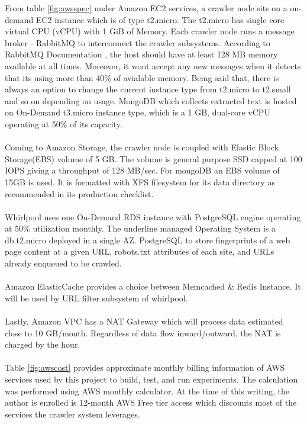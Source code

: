 \noindent
From table \ref{fig:awsspec} under Amazon EC2 services, a crawler node sits on a on-demand EC2 instance which is of type t2.micro. The t2.micro has single core virtual CPU (vCPU) with 1 GiB of Memory. Each crawler node runs a message broker - RabbitMQ to interconnect the crawler subsystems. According to RabbitMQ Documentation
\cite{rabbitmq}, the host should have at least 128 MB memory available at all times. Moreover, it wont accept
any new messages when it detects that its using more than 40\% of avialable memory. Being said that, there is
always an option to change the current instance type from t2.micro to t2.small and so on depending on
usage. MongoDB which collects extracted text is hosted on On-Demand t3.micro instance type, which is a 1 GB, dual-core vCPU operating at 50\% of its capacity.
\\
\\
\noindent
Coming to Amazon Storage,  the crawler node is coupled with Elastic Block Storage(EBS) volume of 5 GB. The volume is general purpose SSD capped at 100 IOPS giving a throughput of 128 MB/sec. For mongoDB an EBS volume
of 15GB is used. It is formatted with XFS filesystem for its data directory as recommended in its production checklist.
\\
\\
\noindent
Whirlpool uses one On-Demand RDS instance with PostgreSQL engine operating at 50\% utilization monthly. The underline managed Operating System is a db.t2.micro deployed in a single AZ. PostgreSQL to store fingerprints of a web page content at a given URL, robots.txt attributes of each site, and URLs already enqueued to be crawled.
\\
\\
Amazon ElasticCache provides a choice between Memcached \& Redis Instance. It will be used by URL filter
subsystem of whirlpool.
\\
\\
Lastly, Amazon VPC has a NAT Gateway which will process data estimated close to 10 GB/month. Regardless of data flow inward/outward, the NAT is charged by the hour.
\\
\\
\noindent
Table \ref{fig:awscost} provides approximate monthly billing information of AWS services used by this project to build, test, and run experiments. The calculation was performed using AWS monthly calculator. At the time of this writing, the author is enrolled is 12-month AWS Free tier access which discounts most of the services
the crawler system leverages.

